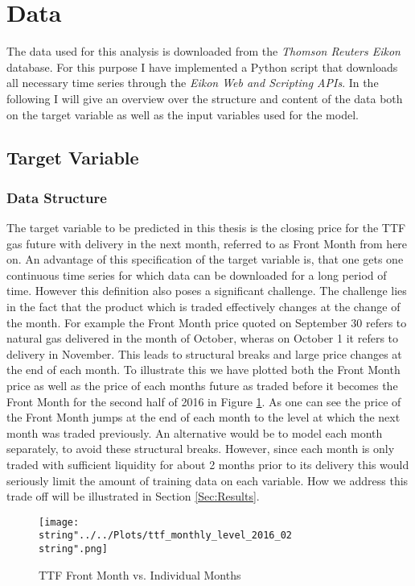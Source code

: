 \section{Data}\label{Sec:Data}
The data used for this analysis is downloaded from the \textit{Thomson Reuters Eikon} database. For this purpose I have implemented a Python script that downloads all necessary time series through the \textit{Eikon Web and Scripting APIs}. In the following I will give an overview over the structure and content of the data both on the target variable as well as the input variables used for the model. 
\subsection{Target Variable}
\subsubsection{Data Structure}
The target variable to be predicted in this thesis is the closing price for the TTF gas future with delivery in the next month, referred to as Front Month from here on. An advantage of this specification of the target variable is, that one gets one continuous time series for which data can be downloaded for a long period of time. However this definition also poses a significant challenge. The challenge lies in the fact that the product which is traded effectively changes at the change of the month. For example the Front Month price quoted on September 30 refers to natural gas delivered in the month of October, wheras on October 1 it refers to delivery in November. This leads to structural breaks and large price changes at the end of each month. To illustrate this we have plotted both the Front Month price as well as the price of each months future as traded before it becomes the Front Month for the second half of 2016 in Figure \ref{fig:ttf_monthly_level_2016_02}. As one can see the price of the Front Month jumps at the end of each month to the level at which the next month was traded previously. An alternative would be to model each month separately, to avoid these structural breaks. However, since each month is only traded with sufficient liquidity for about 2 months prior to its delivery this would seriously limit the amount of training data on each variable. How we address this trade off will be illustrated in Section \ref{Sec:Results}. 
\begin{figure}
  \centering
\texttt{[image: \\string"../../Plots/ttf\_monthly\_level\_2016\_02\\string".png]}
  \caption{TTF Front Month vs. Individual Months}\label{fig:ttf_monthly_level_2016_02}
\end{figure}
